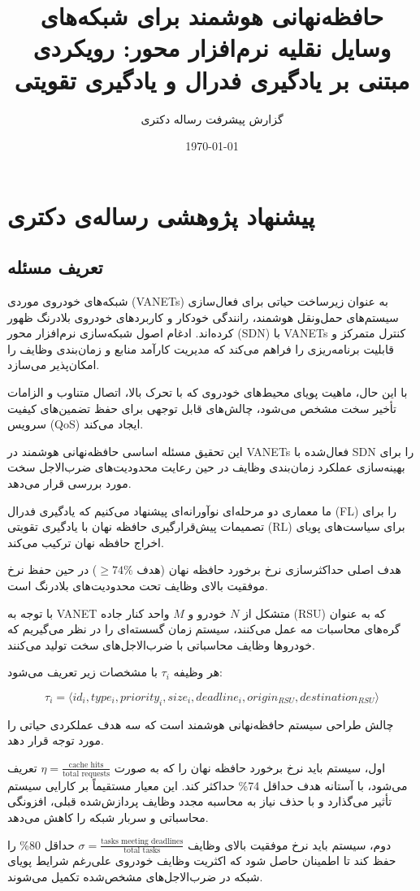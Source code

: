 \documentclass[11pt]{article}
\title{حافظه‌نهانی هوشمند برای شبکه‌های وسایل نقلیه نرم‌افزار محور: رویکردی مبتنی بر یادگیری فدرال و یادگیری تقویتی}
\author{گزارش پیشرفت رساله دکتری}
\date{\today}
\newcommand{\فصل}[1]{\section{#1}}
\newcommand{\قسمت}[1]{\subsection{#1}}
\begin{document}
\maketitle

\فصل{پیشنهاد پژوهشی رساله‌ی دکتری}

\قسمت{تعریف مسئله}

شبکه‌های خودروی موردی (VANETs) به عنوان زیرساخت حیاتی برای فعال‌سازی سیستم‌های حمل‌ونقل هوشمند، رانندگی خودکار و کاربردهای خودروی بلادرنگ ظهور کرده‌اند. ادغام اصول شبکه‌سازی نرم‌افزار محور (SDN) با VANETs کنترل متمرکز و قابلیت برنامه‌ریزی را فراهم می‌کند که مدیریت کارآمد منابع و زمان‌بندی وظایف را امکان‌پذیر می‌سازد.

با این حال، ماهیت پویای محیط‌های خودروی که با تحرک بالا، اتصال متناوب و الزامات تأخیر سخت مشخص می‌شود، چالش‌های قابل توجهی برای حفظ تضمین‌های کیفیت سرویس (QoS) ایجاد می‌کند.

این تحقیق مسئله اساسی حافظه‌نهانی هوشمند در VANETs فعال‌شده با SDN را برای بهینه‌سازی عملکرد زمان‌بندی وظایف در حین رعایت محدودیت‌های ضرب‌الاجل سخت مورد بررسی قرار می‌دهد.

ما معماری دو مرحله‌ای نوآورانه‌ای پیشنهاد می‌کنیم که یادگیری فدرال (FL) را برای تصمیمات پیش‌قرارگیری حافظه نهان با یادگیری تقویتی (RL) برای سیاست‌های پویای اخراج حافظه نهان ترکیب می‌کند.

هدف اصلی حداکثرسازی نرخ برخورد حافظه نهان (هدف $\geq 74\%$) در حین حفظ نرخ موفقیت بالای وظایف تحت محدودیت‌های بلادرنگ است.

با توجه به VANET متشکل از $N$ خودرو و $M$ واحد کنار جاده (RSU) که به عنوان گره‌های محاسبات مه عمل می‌کنند، سیستم زمان گسسته‌ای را در نظر می‌گیریم که خودروها وظایف محاسباتی با ضرب‌الاجل‌های سخت تولید می‌کنند.

هر وظیفه $\tau_i$ با مشخصات زیر تعریف می‌شود:

\begin{equation}
\tau_i = \langle id_i, type_i, priority_i, size_i, deadline_i, origin_{RSU}, destination_{RSU} \rangle
\end{equation}

چالش طراحی سیستم حافظه‌نهانی هوشمند است که سه هدف عملکردی حیاتی را مورد توجه قرار دهد.

اول، سیستم باید نرخ برخورد حافظه نهان را که به صورت $\eta = \frac{\text{cache hits}}{\text{total requests}}$ تعریف می‌شود، با آستانه هدف حداقل 74\% حداکثر کند. این معیار مستقیماً بر کارایی سیستم تأثیر می‌گذارد و با حذف نیاز به محاسبه مجدد وظایف پردازش‌شده قبلی، افزونگی محاسباتی و سربار شبکه را کاهش می‌دهد.

دوم، سیستم باید نرخ موفقیت بالای وظایف $\sigma = \frac{\text{tasks meeting deadlines}}{\text{total tasks}}$ حداقل 80\% را حفظ کند تا اطمینان حاصل شود که اکثریت وظایف خودروی علی‌رغم شرایط پویای شبکه در ضرب‌الاجل‌های مشخص‌شده تکمیل می‌شوند.
\end{document}
